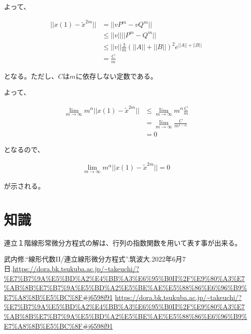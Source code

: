 \documentclass[a4paper, 10pt, dvipdfmx]{jlreq}
\begin{document}
よって、

\begin{align*}
  ||x(1)-\tilde{x}^{2m}|| & =||vP^m-vQ^m||                                                   \\
                          & \leq ||v||||P^m-Q^m||                                            \\
                          & \leq ||v||\frac{2}{m} \left(||A||+||B||\right)^2 e^{||A||+||B||} \\
                          & =\frac{C}{m}
\end{align*}

となる。ただし、$C$は$m$に依存しない定数である。

よって、

\begin{align*}
  \lim_{m \to \infty} m^\alpha ||x(1)-\tilde{x}^{2m}|| & \leq \lim_{m \to \infty} {m^\alpha \frac{C}{m}} \\
                                                       & =\lim_{m \to \infty} \frac{C}{m^{1-\alpha}}     \\
                                                       & =0
\end{align*}

となるので、

\begin{align*}
  \lim_{m \to \infty} m^\alpha ||x(1)-\tilde{x}^{2m}||=0
\end{align*}

が示される。

\section{知識}

連立１階線形常微分方程式の解は、行列の指数関数を用いて表す事が出来る。


\begin{thebibliography}{9}
  武内修.``線形代数II/連立線形微分方程式''.筑波大.2022年6月7日.\url{https://dora.bk.tsukuba.ac.jp/~takeuchi/?%E7%B7%9A%E5%BD%A2%E4%BB%A3%E6%95%B0II%2F%E9%80%A3%E7%AB%8B%E7%B7%9A%E5%BD%A2%E5%BE%AE%E5%88%86%E6%96%B9%E7%A8%8B%E5%BC%8F#j6598f91}
  \url{https://dora.bk.tsukuba.ac.jp/~takeuchi/?%E7%B7%9A%E5%BD%A2%E4%BB%A3%E6%95%B0II%2F%E9%80%A3%E7%AB%8B%E7%B7%9A%E5%BD%A2%E5%BE%AE%E5%88%86%E6%96%B9%E7%A8%8B%E5%BC%8F#j6598f91}
\end{thebibliography}
\end{document}
